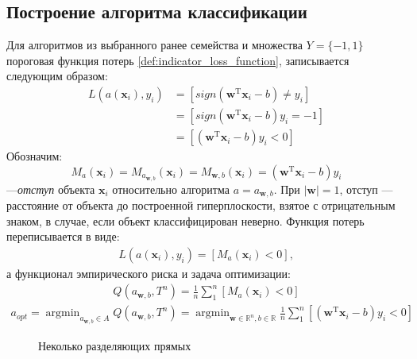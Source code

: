 \documentclass[%
bachelor,    %
subf,        %
href,        %
colorlinks,  %
]{disser}
\let\vec=\mathbf
\DeclareMathOperator*{\argmin}{argmin}
\begin{document}
\subsection{Построение алгоритма классификации}


Для алгоритмов из выбранного ранее семейства  и множества $Y=\{-1,1\}$ пороговая функция потерь \eqref{def:indicator_loss_function}, записывается следующим образом:
\begin{equation}
\begin{aligned}
L(a(\vec{x}_i),y_i)&=[sign(\vec{w}^\mathrm{T}\vec{x}_i - b) \neq y_i] \\
&= [sign(\vec{w}^\mathrm{T}\vec{x}_i - b)  y_i = -1] \\
&= [(\vec{w}^\mathrm{T}\vec{x}_i - b)  y_i < 0]
\end{aligned}
\end{equation}
Обозначим:
$$M_{a}(\vec{x}_i) = M_{a_{\vec{w},b}}(\vec{x}_i)= M_{\vec{w},b}(\vec{x}_i) = (\vec{w}^\mathrm{T}\vec{x}_i - b)  y_i$$ 
---\textit{отступ} объекта $\vec{x}_i$ относительно алгоритма $a = a_{\vec{w},b}$.
При $|\vec{w}|= 1$, отступ --- расстояние от объекта до построенной гиперплоскости, взятое с отрицательным знаком, в случае, если объект классифицирован неверно. Функция потерь переписывается в виде:
\begin{equation}
\begin{aligned}
L(a(\vec{x}_i),y_i)=[M_{a}(\vec{x}_i) <0],
\end{aligned}
\end{equation} 
а функционал эмпирического риска и задача оптимизации: 
\begin{equation}
\begin{aligned}
Q(a_{\vec{w},b},T^n)=\frac{1}{n} \sum_{1}^{n} [M_{a}(\vec{x}_i) < 0]
\end{aligned}
\end{equation}
\begin{equation}
\begin{aligned}a_{opt} 
= \argmin_{a_{\vec{w},b} \in A} Q(a_{\vec{w},b},T^n) 
= \argmin_{\vec{w} \in \mathbb{R}^n, b \in \mathbb{R}} \frac{1}{n} \sum_{1}^{n} [(\vec{w}^\mathrm{T}\vec{x}_i - b)  y_i < 0]
\end{aligned}
\end{equation}
\begin{figure}
	\centering		
	
	\caption{Неколько разделяющих прямых}
	\label{fig:example3}
\end{figure}
\end{document}
